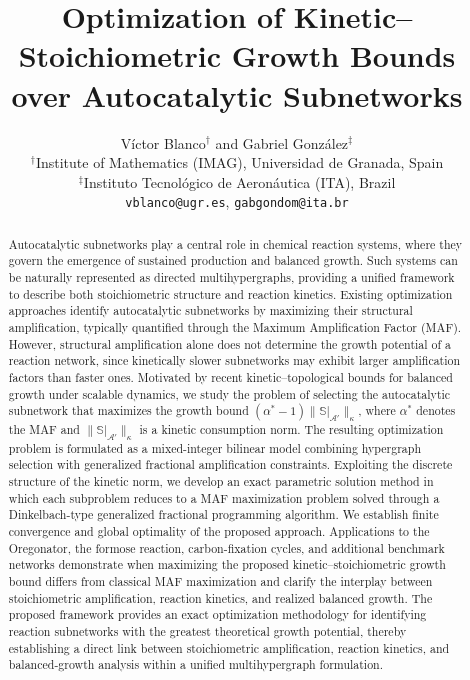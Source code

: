 \documentclass[a4paper,11pt,reqno]{amsart}
\let\origmaketitle\maketitle
\def\maketitle{
	\begingroup
	\def\uppercasenonmath##1{} %
	\let\MakeUppercase\relax %
	\origmaketitle
	\endgroup
}
\begin{document}
\title[Optimization of Growth Bounds over Autocatalytic Subnetworks]{\Large Optimization of Kinetic--Stoichiometric Growth Bounds over Autocatalytic Subnetworks}

\author[V. Blanco and G. Gonz\'alez]{
{\large V\'ictor Blanco$^{\dagger}$ and Gabriel Gonz\'alez$^{\ddagger}$}\bigskip\\
\small $^\dagger$Institute of Mathematics (IMAG), Universidad de Granada, Spain\\
\small $^\ddagger$Instituto Tecnológico de Aeronáutica (ITA), Brazil\bigskip\\
\small \texttt{vblanco@ugr.es}, \texttt{gabgondom@ita.br}
}

\maketitle


\begin{abstract}
Autocatalytic subnetworks play a central role in chemical
reaction systems, where they govern the emergence of sustained production and
balanced growth. Such systems can be naturally represented as directed
multihypergraphs, providing a unified framework to describe both
stoichiometric structure and reaction kinetics. Existing optimization
approaches identify autocatalytic subnetworks by maximizing their structural
amplification, typically quantified through the Maximum Amplification Factor
(MAF). However, structural amplification alone does not determine the growth
potential of a reaction network, since kinetically slower subnetworks may
exhibit larger amplification factors than faster ones. Motivated by recent
kinetic--topological bounds for balanced growth under scalable dynamics, we
study the problem of selecting the autocatalytic subnetwork that maximizes
the growth bound
$(\alpha^*-1)\|\mathbb{S}|_{\mathcal A'}\|_\kappa$,
where $\alpha^*$ denotes the MAF and
$\|\mathbb{S}|_{\mathcal A'}\|_\kappa$ is a kinetic consumption norm. The
resulting optimization problem is formulated as a mixed-integer bilinear model
combining hypergraph selection with generalized fractional amplification
constraints. Exploiting the discrete structure of the kinetic norm, we develop
an exact parametric solution method in which each subproblem reduces to a MAF
maximization problem solved through a Dinkelbach-type generalized fractional
programming algorithm. We establish finite convergence and global optimality
of the proposed approach. Applications to the Oregonator, the formose
reaction, carbon-fixation cycles, and additional benchmark networks
demonstrate when maximizing the proposed kinetic--stoichiometric growth bound
differs from classical MAF maximization and clarify the interplay between
stoichiometric amplification, reaction kinetics, and realized balanced growth.
The proposed framework provides an exact optimization methodology for
identifying reaction subnetworks with the greatest theoretical growth
potential, thereby establishing a direct link between stoichiometric
amplification, reaction kinetics, and balanced-growth analysis within a
unified multihypergraph formulation.
\end{abstract}
 
\end{document}
